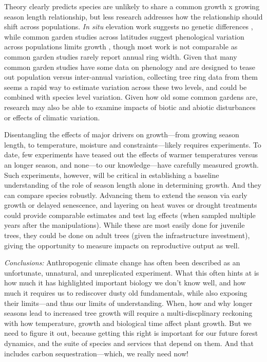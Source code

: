 \documentclass[11pt]{article}
\begin{document}
Theory clearly predicts species are unlikely to share a common growth x growing season length relationship, but less research addresses how the relationship should shift across populations. \emph{In situ} elevation work suggests no genetic differences \citep{king2013tree}, while common garden studies across latitudes suggest phenological variation across populations limits growth \citep{soolanayakanahally2013timing}, though most work is not comparable as common garden studies rarely report annual ring width. Given that many common garden studies have some data on phenology and are designed to tease out population versus inter-annual variation, collecting tree ring data from them seems a rapid way to estimate variation across these two levels, and could be combined with species level variation. Given how old some common gardens are, research may also be able to examine impacts of biotic and abiotic disturbances or effects of climatic variation.

Disentangling the effects of major drivers on growth---from growing season length, to temperature, moisture and constraints---likely requires experiments. To date, few experiments have teased out the effects of warmer temperatures versus an longer season, and none---to our knowledge---have carefully measured growth. Such experiments, however, will be critical in establishing a baseline understanding of the role of season length alone in determining growth. And they can compare species robustly. Advancing them to extend the season via early growth or delayed senescence, and layering on heat waves or drought treatments could provide comparable estimates and test lag effects (when sampled multiple years after the manipulations). While these are most easily done for juvenile trees, they could be done on adult trees (given the infrastructure investment), giving the opportunity to measure impacts on reproductive output as well. 

\emph{Conclusions:}
Anthropogenic climate change has often been described as an unfortunate, unnatural, and unreplicated experiment. What this often hints at is how much it has highlighted important biology we don't know well, and how much it requires us to rediscover dusty old fundamentals, while also exposing their limits---and thus our limits of understanding. When, how and why longer seasons lead to increased tree growth will require a multi-discplinary reckoning with how temperature, growth and biological time affect plant growth. But we need to figure it out, because getting this right is important for our future forest dynamics, and the suite of species and services that depend on them. And that includes carbon sequestration---which, we really need now! 
\end{document}
